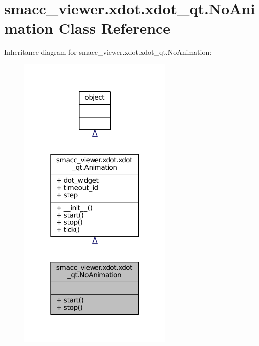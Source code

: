 \hypertarget{classsmacc__viewer_1_1xdot_1_1xdot__qt_1_1NoAnimation}{}\section{smacc\+\_\+viewer.\+xdot.\+xdot\+\_\+qt.\+No\+Animation Class Reference}
\label{classsmacc__viewer_1_1xdot_1_1xdot__qt_1_1NoAnimation}


Inheritance diagram for smacc\+\_\+viewer.\+xdot.\+xdot\+\_\+qt.\+No\+Animation\+:
\nopagebreak
\begin{figure}[H]
\begin{center}
\leavevmode
\includegraphics[width=211pt]{classsmacc__viewer_1_1xdot_1_1xdot__qt_1_1NoAnimation__inherit__graph}
\end{center}
\end{figure}


